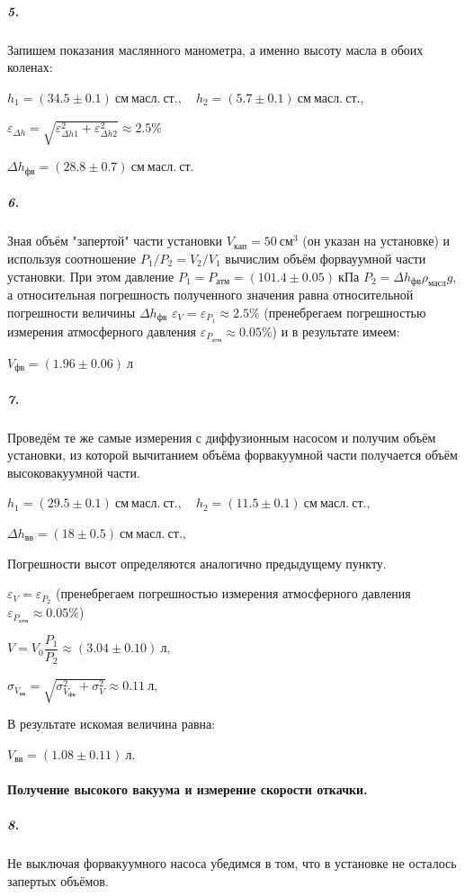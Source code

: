 \documentclass[a4paper,12pt]{article}
\begin{document}
\subparagraph{5.} Запишем показания маслянного манометра, а именно высоту масла в обоих коленах: 

$
h_1 = (34.5 \pm 0.1)~см~масл. ~ст.,\quad  h_2 = (5.7 \pm 0.1)~ см ~масл. ~ст.,
$

$\varepsilon_{\Delta h} = \sqrt{\varepsilon_{\Delta h1}^2 + \varepsilon_{\Delta h2}^2}\approx 2.5 \%$

$
\Delta h_{фв} = (28.8 \pm 0.7) ~ см ~масл. ~ст.
$

\subparagraph{6.} Зная объём "запертой"  части установки $V_{кап} = 50 ~ см^3$ (он указан на установке) и используя соотношение $P_1/P_2=V_2/V_1$ вычислим объём форвауумной части установки. При этом давление $P_1 = P_{атм} = (101.4 \pm 0.05) ~ кПа$ $P_2 = \Delta h_{фв}  \rho_{масл} g$, а относительная погрешность полученного значения равна относительной погрешности величины $\Delta h_{фв} $ 
$
\varepsilon_V = \varepsilon_{P_1} \approx 2.5\%
$
(пренебрегаем погрешностью измерения атмосферного давления $\varepsilon_{P_{атм}} \approx 0.05 \%$) и в результате имеем: 

$
V_{фв} = (1.96 \pm 0.06)~ л
$

\subparagraph{7.} Проведём те же самые измерения с диффузионным насосом и получим объём установки, из которой вычитанием объёма форвакуумной части получается объём высоковакуумной части. 

$
h_1 = (29.5 \pm 0.1)~см~масл. ~ст., \quad h_2 = (11.5\pm 0.1)~ см ~масл. ~ст.,
$


$
\Delta h_{вв} = (18 \pm 0.5) ~ см ~масл. ~ст.,
$

Погрешности высот определяются аналогично предыдущему пункту. 

$
\varepsilon_V = \varepsilon_{P_2}
$
(пренебрегаем погрешностью измерения атмосферного давления $\varepsilon_{P_{атм}} \approx 0.05 \%$)

$
V = V_0 \dfrac{P_1}{P_2} \approx (3.04 \pm 0.10) ~ л,
$

$
\sigma_{V_{вв}} = \sqrt{\sigma_{V_{фв}}^2 + \sigma_{V}^2} \approx 0.11~л,
$

 В результате искомая величина равна: 

$
V_{вв} = (1.08 \pm 0.11) ~ л.
$


\paragraph{Получение высокого вакуума и измерение скорости откачки.}

\subparagraph*{8.} Не выключая форвакуумного насоса убедимся в том, что в установке не осталось запертых объёмов. 
\end{document}
